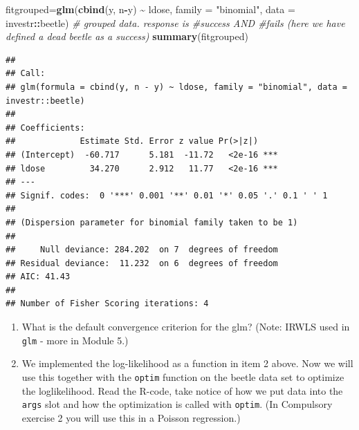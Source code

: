 \documentclass[
]{article}
\newenvironment{Shaded}{\begin{snugshade}}{\end{snugshade}}
\newcommand{\AttributeTok}[1]{\textcolor[rgb]{0.13,0.29,0.53}{#1}}
\newcommand{\CommentTok}[1]{\textcolor[rgb]{0.56,0.35,0.01}{\textit{#1}}}
\newcommand{\FunctionTok}[1]{\textcolor[rgb]{0.13,0.29,0.53}{\textbf{#1}}}
\newcommand{\NormalTok}[1]{#1}
\newcommand{\OtherTok}[1]{\textcolor[rgb]{0.56,0.35,0.01}{#1}}
\newcommand{\SpecialCharTok}[1]{\textcolor[rgb]{0.81,0.36,0.00}{\textbf{#1}}}
\newcommand{\StringTok}[1]{\textcolor[rgb]{0.31,0.60,0.02}{#1}}
\begin{document}
\begin{Shaded}
\begin{Highlighting}[]
\NormalTok{fitgrouped}\OtherTok{=}\FunctionTok{glm}\NormalTok{(}\FunctionTok{cbind}\NormalTok{(y, n}\SpecialCharTok{{-}}\NormalTok{y) }\SpecialCharTok{\textasciitilde{}}\NormalTok{ ldose, }\AttributeTok{family =} \StringTok{"binomial"}\NormalTok{, }\AttributeTok{data =}\NormalTok{ investr}\SpecialCharTok{::}\NormalTok{beetle) }\CommentTok{\# grouped data. response is \#success AND \#fails (here we have defined a dead beetle as a success)}
\FunctionTok{summary}\NormalTok{(fitgrouped)}
\end{Highlighting}
\end{Shaded}

\begin{verbatim}
## 
## Call:
## glm(formula = cbind(y, n - y) ~ ldose, family = "binomial", data = investr::beetle)
## 
## Coefficients:
##             Estimate Std. Error z value Pr(>|z|)    
## (Intercept)  -60.717      5.181  -11.72   <2e-16 ***
## ldose         34.270      2.912   11.77   <2e-16 ***
## ---
## Signif. codes:  0 '***' 0.001 '**' 0.01 '*' 0.05 '.' 0.1 ' ' 1
## 
## (Dispersion parameter for binomial family taken to be 1)
## 
##     Null deviance: 284.202  on 7  degrees of freedom
## Residual deviance:  11.232  on 6  degrees of freedom
## AIC: 41.43
## 
## Number of Fisher Scoring iterations: 4
\end{verbatim}

\begin{enumerate}
\def\labelenumi{\alph{enumi})}
\setcounter{enumi}{1}
\item
  What is the default convergence criterion for the glm? (Note: IRWLS
  used in \texttt{glm} - more in Module 5.)
\item
  We implemented the log-likelihood as a function in item 2 above. Now
  we will use this together with the \texttt{optim} function on the
  beetle data set to optimize the loglikelihood. Read the R-code, take
  notice of how we put data into the \texttt{args} slot and how the
  optimization is called with \texttt{optim}. (In Compulsory exercise 2
  you will use this in a Poisson regression.)
\end{enumerate}
\end{document}
